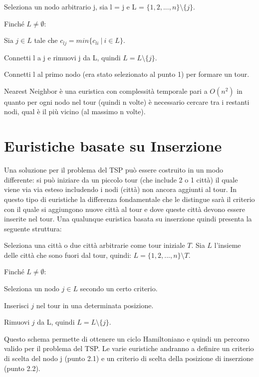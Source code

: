\documentclass[a4paper,12pt]{report}
\begin{document}
\begin{legal}
  \item Seleziona un nodo arbitrario j, sia l = j e L = $\{1, 2, ..., n\} \setminus \{j\}$.
  \item Finché $L \neq \emptyset$:
  \begin{legal}
    \item Sia $j \in L$ tale che $c_{lj} = min\{c_{li} \  | \  i \in L\}$.
    \item Connetti l a j e rimuovi j da L, quindi $ L = L \setminus \{j\} $.
  \end{legal}
  \item Connetti l al primo nodo (era stato selezionato al punto 1) per formare un tour.
\end{legal}
\hfill \break
Nearest Neighbor è una euristica con complessità temporale pari a $O(n^2)$ in quanto per ogni nodo nel tour (quindi n volte) è necessario cercare tra i restanti nodi, qual è il più vicino (al massimo n volte).

\section{Euristiche basate su Inserzione}
Una soluzione per il problema del TSP può essere costruito in un modo differente: si può iniziare da un piccolo tour (che include 2 o 1 città) il quale viene via via esteso includendo i nodi (città) non ancora aggiunti al tour. In questo tipo di euristiche la differenza fondamentale che le distingue sarà il criterio con il quale si aggiungono nuove città al tour e dove queste città devono essere inserite nel tour. Una qualunque euristica basata su inserzione quindi presenta la seguente struttura:

\begin{legal}
  \item Seleziona una città o due città arbitrarie come tour iniziale $T$. Sia $L$ l'insieme delle città che sono fuori dal tour, quindi: $L = \{1, 2, ..., n\} \setminus T$.
  \item Finché $L \neq \emptyset$:
  \begin{legal}
    \item Seleziona un nodo $j \in L$ secondo un certo criterio.
    \item Inserisci $j$ nel tour in una determinata posizione.
    \item Rimuovi $j$ da L, quindi $L = L \setminus \{j\}$.
  \end{legal}
\end{legal}
\hfill \break
Questo schema permette di ottenere un ciclo Hamiltoniano e quindi un percorso valido per il problema del TSP. Le varie euristiche andranno a definire un criterio di scelta del nodo j (punto 2.1) e un criterio di scelta della posizione di inserzione (punto 2.2).
\end{document}
